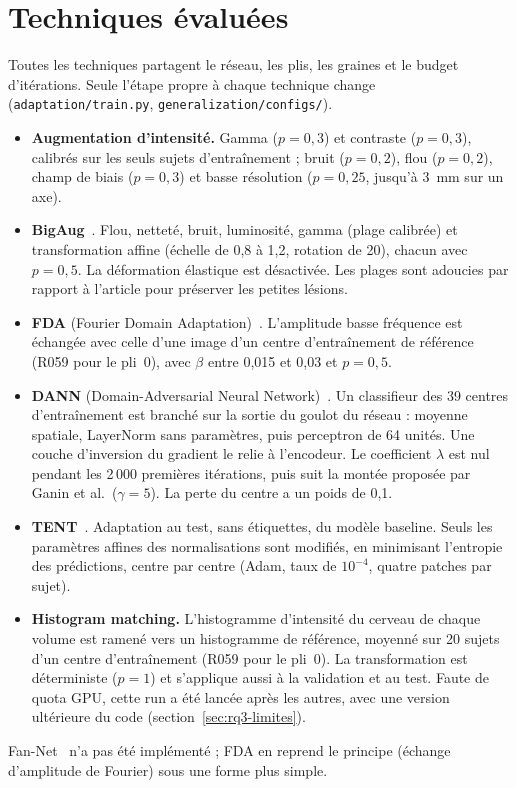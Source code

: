 \section{Techniques évaluées}
\label{sec:rq3-techniques}

Toutes les techniques partagent le réseau, les plis, les graines et le budget d'itérations. Seule l'étape propre à chaque technique change (\nolinkurl{adaptation/train.py}, \nolinkurl{generalization/configs/}).

\begin{itemize}
  \item \textbf{Augmentation d'intensité.} Gamma ($p = 0{,}3$) et contraste ($p = 0{,}3$), calibrés sur les seuls sujets d'entraînement ; bruit ($p = 0{,}2$), flou ($p = 0{,}2$), champ de biais ($p = 0{,}3$) et basse résolution ($p = 0{,}25$, jusqu'à 3~mm sur un axe).
  \item \textbf{BigAug}~\cite{zhang2020bigaug}. Flou, netteté, bruit, luminosité, gamma (plage calibrée) et transformation affine (échelle de 0,8 à 1,2, rotation de 20\textdegree), chacun avec $p = 0{,}5$. La déformation élastique est désactivée. Les plages sont adoucies par rapport à l'article pour préserver les petites lésions.
  \item \textbf{FDA} (Fourier Domain Adaptation)~\cite{yang2020fda}. L'amplitude basse fréquence est échangée avec celle d'une image d'un centre d'entraînement de référence (R059 pour le pli~0), avec $\beta$ entre 0,015 et 0,03 et $p = 0{,}5$.
  \item \textbf{DANN} (Domain-Adversarial Neural Network)~\cite{ganin2016dann}. Un classifieur des 39 centres d'entraînement est branché sur la sortie du goulot du réseau : moyenne spatiale, LayerNorm sans paramètres, puis perceptron de 64 unités. Une couche d'inversion du gradient le relie à l'encodeur. Le coefficient $\lambda$ est nul pendant les 2\,000 premières itérations, puis suit la montée proposée par Ganin et al.\ ($\gamma = 5$). La perte du centre a un poids de 0,1.
  \item \textbf{TENT}~\cite{wang2021tent}. Adaptation au test, sans étiquettes, du modèle baseline. Seuls les paramètres affines des normalisations sont modifiés, en minimisant l'entropie des prédictions, centre par centre (Adam, taux de $10^{-4}$, quatre patches par sujet).
  \item \textbf{Histogram matching.} L'histogramme d'intensité du cerveau de chaque volume est ramené vers un histogramme de référence, moyenné sur 20 sujets d'un centre d'entraînement (R059 pour le pli~0). La transformation est déterministe ($p = 1$) et s'applique aussi à la validation et au test. Faute de quota GPU, cette run a été lancée après les autres, avec une version ultérieure du code (section~\ref{sec:rq3-limites}).
\end{itemize}
Fan-Net~\cite{yu2023fannet} n'a pas été implémenté ; FDA en reprend le principe (échange d'amplitude de Fourier) sous une forme plus simple.

